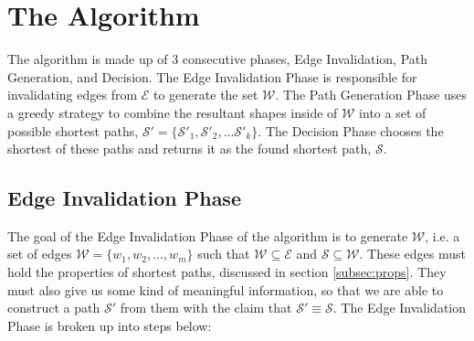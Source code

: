 \documentclass[12pt]{article}
\begin{document}
\section{The Algorithm}
The algorithm is made up of 3 consecutive phases,
Edge Invalidation, Path Generation, and Decision.
The Edge Invalidation Phase is
responsible for invalidating edges from $\mathcal{E}$ to generate the set
$\mathcal{W}$. The Path Generation Phase uses a greedy strategy to combine the resultant
shapes inside of $\mathcal{W}$ into a set of possible shortest paths,
$\mathcal{S}' = \{\mathcal{S}'_1, \mathcal{S}'_2, ... \mathcal{S}'_k\}$.
The Decision Phase chooses the shortest of these paths and returns it as the
found shortest path, $\mathcal{S}$.

\subsection{Edge Invalidation Phase}\label{subsec:edge-gen}
The goal of the Edge Invalidation Phase of the algorithm is to generate $\mathcal{W}$,
i.e. a set of
edges $\mathcal{W} = \{w_1, w_2, ..., w_m\}$ such that
$\mathcal{W} \subseteq \mathcal{E}$ and $\mathcal{S} \subseteq \mathcal{W}$.
These edges must hold the properties of shortest paths, discussed in section
\ref{subsec:props}.
They must also give us some kind of meaningful information, so that we are able to
construct a path $\mathcal{S}'$ from them with the claim that
$\mathcal{S}' \equiv \mathcal{S}$.
The Edge Invalidation Phase is broken up into steps below:
\end{document}
